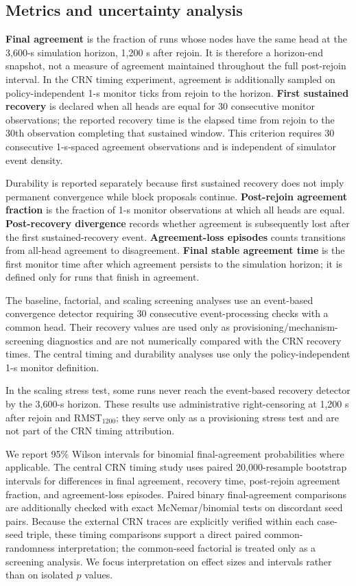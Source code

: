 \documentclass[11pt]{article}
\begin{document}
\subsection{Metrics and uncertainty analysis}
\textbf{Final agreement} is the fraction of runs whose nodes have the same head at the 3,600-s simulation horizon, 1,200 s after rejoin. It is therefore a horizon-end snapshot, not a measure of agreement maintained throughout the full post-rejoin interval. In the CRN timing experiment, agreement is additionally sampled on policy-independent 1-s monitor ticks from rejoin to the horizon. \textbf{First sustained recovery} is declared when all heads are equal for 30 consecutive monitor observations; the reported recovery time is the elapsed time from rejoin to the 30th observation completing that sustained window.
This criterion requires 30 consecutive 1-s-spaced agreement observations and is independent of simulator event density.


Durability is reported separately because first sustained recovery does not imply permanent convergence while block proposals continue. \textbf{Post-rejoin agreement fraction} is the fraction of 1-s monitor observations at which all heads are equal. \textbf{Post-recovery divergence} records whether agreement is subsequently lost after the first sustained-recovery event. \textbf{Agreement-loss episodes} counts transitions from all-head agreement to disagreement. \textbf{Final stable agreement time} is the first monitor time after which agreement persists to the simulation horizon; it is defined only for runs that finish in agreement.

The baseline, factorial, and scaling screening analyses use an event-based convergence detector requiring 30 consecutive event-processing checks with a common head. Their recovery values are used only as provisioning/mechanism-screening diagnostics and are not numerically compared with the CRN recovery times. The central timing and durability analyses use only the policy-independent 1-s monitor definition.

In the scaling stress test, some runs never reach the event-based recovery detector by the 3,600-s horizon. These results use administrative right-censoring at 1,200 s after rejoin and RMST$_{1200}$; they serve only as a provisioning stress test and are not part of the CRN timing attribution.

We report 95\% Wilson intervals for binomial final-agreement probabilities where applicable.
The central CRN timing study uses paired 20,000-resample bootstrap intervals for differences in final agreement, recovery time, post-rejoin agreement fraction, and agreement-loss episodes. Paired binary final-agreement comparisons are additionally checked with exact McNemar/binomial tests on discordant seed pairs.
Because the external CRN traces are explicitly verified within each case-seed triple, these timing comparisons support a direct paired common-randomness interpretation; the common-seed factorial is treated only as a screening analysis. We focus interpretation on effect sizes and intervals rather than on isolated $p$ values.
\end{document}
